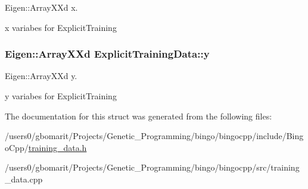 Eigen\+::\+Array\+X\+Xd x. 

x variabes for Explicit\+Training 
\subsubsection[{\texorpdfstring{y}{y}}]{\setlength{\rightskip}{0pt plus 5cm}Eigen\+::\+Array\+X\+Xd Explicit\+Training\+Data\+::y}\hypertarget{structExplicitTrainingData_a0a1ca87e118aa4261a910b54cf29d0ee}{}\label{structExplicitTrainingData_a0a1ca87e118aa4261a910b54cf29d0ee}


Eigen\+::\+Array\+X\+Xd y. 

y variabes for Explicit\+Training 

The documentation for this struct was generated from the following files\+:\begin{DoxyCompactItemize}
\item 
/users0/gbomarit/\+Projects/\+Genetic\+\_\+\+Programming/bingo/bingocpp/include/\+Bingo\+Cpp/\hyperlink{training__data_8h}{training\+\_\+data.\+h}\item 
/users0/gbomarit/\+Projects/\+Genetic\+\_\+\+Programming/bingo/bingocpp/src/training\+\_\+data.\+cpp\end{DoxyCompactItemize}
